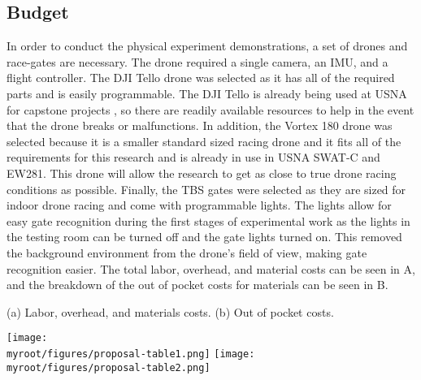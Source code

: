 \documentclass[onecolumn,10pt]{IEEEtran}
\newcommand{\myroot}{../}
\begin{document}
\subsection{Budget}
In order to conduct the physical experiment demonstrations, a set of drones and race-gates are necessary. The drone required a single camera, an IMU, and a flight controller. The DJI Tello drone was selected as it has all of the required parts and is easily programmable. The DJI Tello is already being used at USNA for capstone projects \cite{cuniff2019}, so there are readily available resources to help in the event that the drone breaks or malfunctions. In addition, the Vortex 180 drone was selected because it is a smaller standard sized racing drone and it fits all of the requirements for this research and is already in use in USNA SWAT-C and EW281. This drone will allow the research to get as close to true drone racing conditions as possible. Finally, the TBS gates were selected as they are sized for indoor drone racing and come with programmable lights. The lights allow for easy gate recognition during the first stages of experimental work as the lights in the testing room can be turned off and the gate lights turned on. This removed the background environment from the drone’s field of view, making gate recognition easier. The total labor, overhead, and material costs can be seen in A, and the breakdown of the out of pocket costs for materials can be seen in B.
\begin{table}[hbp]
\caption{(a) Labor, overhead, and materials costs. (b) Out of pocket costs.}
\label{tab:budget}
\begin{center}
\texttt{[image: \\myroot/figures/proposal-table1.png]}
\texttt{[image: \\myroot/figures/proposal-table2.png]}
\end{center}
\end{table}
\end{document}
